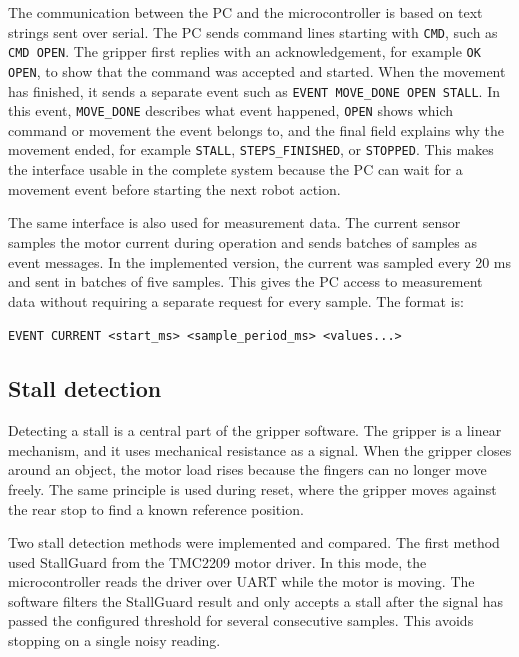 The communication between the PC and the microcontroller is based on text strings sent over serial. The PC sends command lines starting with \texttt{CMD}, such as \texttt{CMD OPEN}. The gripper first replies with an acknowledgement, for example \texttt{OK OPEN}, to show that the command was accepted and started. When the movement has finished, it sends a separate event such as \texttt{EVENT MOVE\_DONE OPEN STALL}. In this event, \texttt{MOVE\_DONE} describes what event happened, \texttt{OPEN} shows which command or movement the event belongs to, and the final field explains why the movement ended, for example \texttt{STALL}, \texttt{STEPS\_FINISHED}, or \texttt{STOPPED}. This makes the interface usable in the complete system because the PC can wait for a movement event before starting the next robot action.

The same interface is also used for measurement data. The current sensor samples the motor current during operation and sends batches of samples as event messages. In the implemented version, the current was sampled every 20 ms and sent in batches of five samples. This gives the PC access to measurement data without requiring a separate request for every sample. The format is:

\begin{center}
\texttt{EVENT CURRENT <start\_ms> <sample\_period\_ms> <values...>}
\end{center}

\subsection{Stall detection}

Detecting a stall is a central part of the gripper software. The gripper is a linear mechanism, and it uses mechanical resistance as a signal. When the gripper closes around an object, the motor load rises because the fingers can no longer move freely. The same principle is used during reset, where the gripper moves against the rear stop to find a known reference position.

Two stall detection methods were implemented and compared. The first method used StallGuard from the TMC2209 motor driver\cite{tmc2209_datasheet}. In this mode, the microcontroller reads the driver over UART while the motor is moving. The software filters the StallGuard result and only accepts a stall after the signal has passed the configured threshold for several consecutive samples. This avoids stopping on a single noisy reading.

